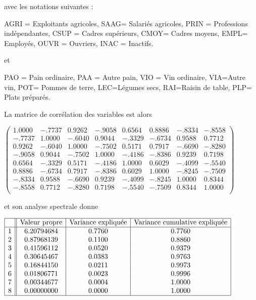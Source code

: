 \documentclass[letterpaper,10pt,french]{sphinxmanual}
\begin{document}
\sphinxAtStartPar
avec les notations suivantes :

\sphinxAtStartPar
AGRI = Exploitants agricoles, SAAG= Salariés agricoles,   PRIN = Professions indépendantes, CSUP = Cadres supérieurs, CMOY= Cadres moyens, EMPL= Employés, OUVR = Ouvriers, INAC = Inactifs.

\sphinxAtStartPar
et

\sphinxAtStartPar
PAO = Pain ordinaire, PAA = Autre pain, VIO = Vin ordinaire, VIA=Autre vin, POT= Pommes de terre, LEC=Légumes secs, RAI=Raisin de table, PLP= Plats préparés.

\sphinxAtStartPar
La matrice de corrélation des variables est alors

\sphinxAtStartPar
\(\begin{pmatrix}
   1.0000   &  -.7737    & 0.9262    & -.9058    & 0.6564  &   0.8886   &  -.8334  &   -.8558\\
    -.7737    & 1.0000    & -.6040    & 0.9044    & -.3329    & -.6734    & 0.9588    & 0.7712\\
   0.9262    & -.6040    & 1.0000    & -.7502    & 0.5171    & 0.7917   &  -.6690     &-.8280\\
  -.9058    & 0.9044    & -.7502    & 1.0000    & -.4186    & -.8386    & 0.9239     &0.7198\\
    0.6564   &  -.3329    & 0.5171    & -.4186    & 1.0000   &  0.6029   &  -.4099    & -.5540\\
  0.8886   &  -.6734    & 0.7917   &  -.8386    & 0.6029   &  1.0000   &  -.8245    & -.7509\\
  -.8334    & 0.9588    & -.6690    & 0.9239    & -.4099    & -.8245    & 1.0000     &0.8344\\
   -.8558    & 0.7712   &  -.8280   &  0.7198   &  -.5540    & -.7509  &   0.8344    & 1.0000\\
\end{pmatrix}\)

\sphinxAtStartPar
et son analyse spectrale donne

\sphinxAtStartPar
\(\begin{array}{|c||c|c|c|}
\hline
                      &    \textrm{Valeur propre}  &      \textrm{Variance expliquée}  &  \textrm{Variance cumulative expliquée}\\
\hline
                     1  &  6.20794684      &      0.7760  &      0.7760\\
                     2   & 0.87968139      &      0.1100    &    0.8860\\
                     3    &0.41596112    &        0.0520      &  0.9379\\
                     4    &0.30645467    &        0.0383      &  0.9763\\
                     5    &0.16844150    &        0.0211      &  0.9973\\
                     6    &0.01806771    &       0.0023       & 0.9996\\
                     7    &0.00344677    &       0.0004       & 1.0000\\
                     8    &0.00000000        &              0.0000      &  1.0000\\
\hline
\end{array}\)
\end{document}
